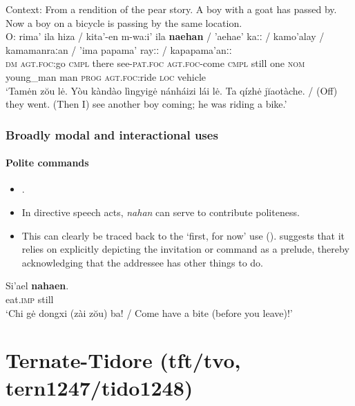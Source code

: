 \begin{exe}
	\ex\label{exAppendixSaisiyatIncrement3}
	Context: From a rendition of the pear story. A boy with a goat has passed by. Now a boy on a bicycle is passing by the same location.\\
	\gll O: rima\rq{} ila hiza / kita’-en m-wa:i\rq{} ila \textbf{naehan} / \rq{}aehae\rq{} kaːː / kamo\rq{}alay / kamamanraːan / \rq{}ima papama\rq{} rayːː / kapapama\rq{}anːː\\
	\textsc{dm} \textsc{agt}.\textsc{foc}:go \textsc{cmpl} there {} see-\textsc{pat}.\textsc{foc} \textsc{agt}.\textsc{foc}-come \textsc{cmpl} still  {} one \textsc{nom} {} young\_man {} man {} \textsc{prog} \textsc{agt}.\textsc{foc}:ride \textsc{loc} {} vehicle\\
	\glt \lq Tamėn zŏu lė. Yòu kàndào lìngyigė nánháizi lái lė. Ta qízhė jĭaotàche. / (Off) they went. (Then I) see another boy coming; he was riding a bike.’ \parencite[108–109]{Huang2008}
\end{exe}

\subsubsection{Broadly modal and interactional uses}
\paragraph{Polite commands}\label{appendixSaisiyatPoliteness}
\begin{itemize}
	\item \textcite[119–120]{Huang2008}.
	\item In directive speech acts, \textit{nahan} can serve to contribute politeness.
	\item This can clearly be traced back to the \lq first, for now\rq{ }use (). \textcite{Huang2008} suggests that it relies on explicitly depicting the invitation or command as a prelude, thereby acknowledging that the addressee has other things to do.
\end{itemize}

\begin{exe}
	\ex
	\gll Si\rq{}ael \textbf{nahaen}.\\
	eat.\textsc{imp} still\\
	\glt \lq Chi gė dongxi (zài zŏu) ba! / Come have a bite (before you leave)!\rq{ }\parencite[120]{Huang2008}
\end{exe}

\section{Ternate-Tidore (tft/tvo, tern1247/tido1248)}
\label{appendixTernateTidore}

